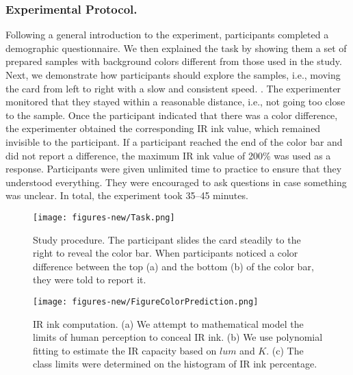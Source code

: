 \subsubsection{Experimental Protocol.}
Following a general introduction to the experiment, participants completed a demographic questionnaire. We then explained the task by showing them a set of prepared samples with background colors different from those used in the study. Next, we demonstrate how participants should explore the samples, i.e., moving the card from left to right with a slow and consistent speed. . The experimenter monitored that they stayed within a reasonable distance, i.e., not going too close to the sample. Once the participant indicated that there was a color difference, the experimenter obtained the corresponding IR ink value, which remained invisible to the participant. If a participant reached the end of the color bar and did not report a difference, the maximum IR ink value of 200\% was used as a response. Participants were given unlimited time to practice to ensure that they understood everything. They were encouraged to ask questions in case something was unclear. In total, the experiment took 35--45 minutes.

\begin{figure}[]
  \centering
  \texttt{[image: figures-new/Task.png]}
  \caption{Study procedure. The participant slides the card steadily to the right to reveal the color bar. When participants noticed a color difference between the top (a) and the bottom (b) of the color bar, they were told to report it.}
  \label{fig:task}
\end{figure}



\begin{figure*}[t]
  \centering
  \texttt{[image: figures-new/FigureColorPrediction.png]}
  \caption{IR ink computation. (a) We attempt to mathematical model the limits of human perception to conceal IR ink. (b) We use polynomial fitting to estimate the IR capacity based on $lum$ and $K$. (c) The class limits were determined on the histogram of IR ink percentage.}
  \label{fig:IRInkComputation}
\end{figure*}



